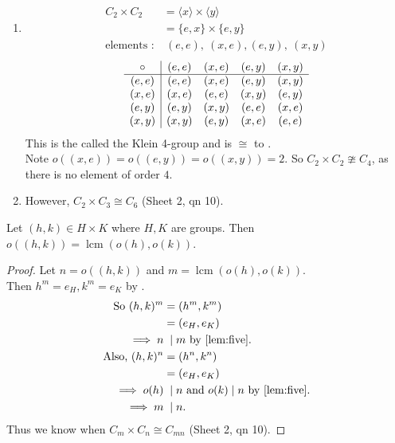 \begin{example} ~\vspace*{-1.5\baselineskip}
  \begin{enumerate}
    \item 
      \begin{align*}
        C_2 \times C_2 &= \langle x \rangle \times \langle y \rangle \\
        &= \{ e, x \} \times \{e, y\} \\
        \text{elements :} &\ (e, e),\ (x, e), (e, y),\ (x, y)
      \end{align*} 
      \begin{align*}
        \begin{array}{c | cccc}
          \circ & (e, e) & (x, e) & (e, y) & (x, y) \\
          \hline
          (e, e) & (e, e) & (x, e) & (e, y) & (x, y) \\
          (x, e) & (x, e) & (e, e) & (x, y) & (e, y) \\
          (e, y) & (e, y) & (x, y) & (e, e) & (x, e) \\
          (x, y) & (x, y) & (e, y) & (x, e) & (e, e)
        \end{array}
      \end{align*} 
      This is the called the Klein 4-group and is $\cong$ to .\\
      Note $o\left( (x, e) \right) = o\left( (e, y) \right) = o\left( (x, y) \right) = 2$. So $C_2 \times C_2 \ncong C_4$, as there is no element of order $4$.
    \item However, $C_2 \times C_3 \cong C_6$ (Sheet 2, qn 10).
  \end{enumerate} 
\end{example} 

\begin{lemma}
    Let $(h, k) \in H \times K$ where $H, K$ are groups. 
    Then $o\left( (h, k) \right) = \operatorname{lcm} \left( o(h), o(k) \right)$.
\end{lemma} 

\begin{proof}
  Let $n = o\left( (h, k) \right)$ and $m = \operatorname{lcm} \left( o(h), o(k) \right)$.\\
  Then $h^m = e_H, k^m = e_K$ by .
  \begin{align*}
    \text{So } (h, k)^m &= (h^m, k^m) \\
    &= (e_H, e_K) \\
    \implies n &\;\mid m \text{ by \Cref{lem:five}}. \\
    \text{Also, } (h, k)^n &= (h^n, k^n) \\
    &= (e_H, e_K) \\
    \implies o(h) &\;\mid n \text{ and } o(k) \mid n \text{ by \Cref{lem:five}}. \\
    \implies m &\;\mid n.
  \end{align*} 
  Thus we know when $C_m \times C_n \cong C_{mn}$ (Sheet 2, qn 10).
\end{proof} 

